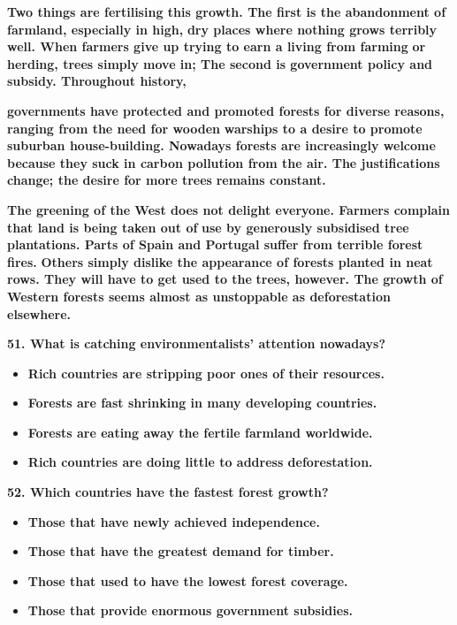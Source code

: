 \documentclass[UTF8,11pt]{ctexart}
\begin{document}
\textbf{Two things are fertilising this \textperiodcentered{}growth. The first is the abandonment of farmland, especially in high,} \textbf{dry places where nothing grows terribly well. When farmers give up trying to earn a living from farming} \textbf{or herding, trees simply move in; The second is government policy and subsidy. Throughout history,}


\textbf{governments have protected and promoted forests for diverse reasons, ranging from the need for wooden} \textbf{warships to a desire to promote suburban house-building. Nowadays forests are increasingly welcome} \textbf{because they suck in carbon pollution from the air. The justifications change; the desire for more trees} \textbf{remains constant.}


\textbf{The greening of the West does not delight everyone. Farmers complain that land is being taken out of} \textbf{use by generously subsidised tree plantations. Parts of Spain and Portugal suffer from terrible forest fires.} \textbf{Others simply dislike the appearance of forests planted in neat rows. They will have to get used to the} \textbf{trees, however. The growth of Western forests seems almost as unstoppable as deforestation elsewhere.}


\textbf{51. What is catching environmentalists' attention nowadays?}


\begin{itemize}[leftmargin=2em,itemsep=.2em,topsep=.4em]\item[A.] \textbf{Rich countries are stripping poor ones of their resources.}
\item[B.] \textbf{Forests are fast shrinking in many developing countries.}
\item[C.] \textbf{Forests are eating away the fertile farmland worldwide.}
\item[D.] \textbf{Rich countries are doing little to address deforestation.}
\end{itemize}

\textbf{52. Which countries have the fastest forest growth?}


\begin{itemize}[leftmargin=2em,itemsep=.2em,topsep=.4em]\item[A.] \textbf{Those that have newly achieved independence.}
\item[B.] \textbf{Those that have the greatest demand for timber.}
\item[C.] \textbf{Those that used to have the lowest forest coverage.}
\item[D.] \textbf{Those that provide enormous government subsidies.}
\end{itemize}
\end{document}
